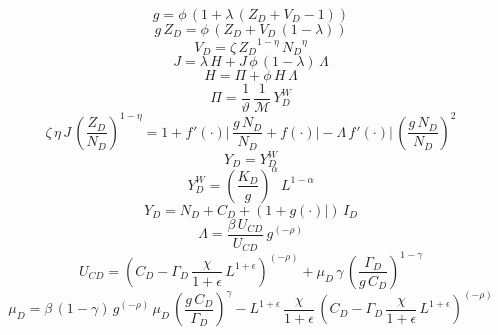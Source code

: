 \documentclass[10pt,a4paper]{article}
\begin{document}
\footnotesize
\begin{dmath}
{g}=\phi\, \left(1+\lambda\, \left({Z_D}+{V_D}-1\right)\right)
\end{dmath}
\begin{dmath}
{g}\, {Z_D}=\phi\, \left({Z_D}+{V_D}\, \left(1-\lambda\right)\right)
\end{dmath}
\begin{dmath}
{V_D}={\zeta}\, {Z_D}^{1-\eta}\, {N_D}^{\eta}
\end{dmath}
\begin{dmath}
{J}=\lambda\, {H}+{J}\, \phi\, \left(1-\lambda\right)\, {\Lambda}
\end{dmath}
\begin{dmath}
{H}={\Pi}+\phi\, {H}\, {\Lambda}
\end{dmath}
\begin{dmath}
{\Pi}=\frac{1}{\vartheta}\, \frac{1}{\mathcal{M}}\, {Y^W_D}
\end{dmath}
\begin{dmath}
{\zeta}\, \eta\, {J}\, \left(\frac{{Z_D}}{{N_D}}\right)^{1-\eta}=1+{\left.       f^‎{\prime}\left( \cdot \right)   \right|}\, \frac{{g}\, {N_D}}{{N_D}}+{\left.       f\left( \cdot \right)            \right|}-{\Lambda}\, {\left.       f^‎{\prime}\left( \cdot \right)   \right|}\, \left(\frac{{g}\, {N_D}}{{N_D}}\right)^{2}
\end{dmath}
\begin{dmath}
{Y_D}={Y^W_D}
\end{dmath}
\begin{dmath}
{Y^W_D}=\left(\frac{{K_D}}{{g}}\right)^{\alpha}\, {L}^{1-\alpha}
\end{dmath}
\begin{dmath}
{Y_D}={N_D}+{C_D}+\left(1+{\left.       g\left( \cdot \right)            \right|}\right)\, {I_D}
\end{dmath}
\begin{dmath}
{\Lambda}=\frac{\beta\, {U_{CD}}}{{U_{CD}}}\, {g}^{\left(-\rho\right)}
\end{dmath}
\begin{dmath}
{U_{CD}}=\left({C_D}-{\Gamma_D}\, \frac{\chi}{1+\epsilon}\, {L}^{1+\epsilon}\right)^{\left(-\rho\right)}+{{\mu}_{D}}\, \gamma\, \left(\frac{{\Gamma_D}}{{g}\, {C_D}}\right)^{1-\gamma}
\end{dmath}
\begin{dmath}
{{\mu}_{D}}=\beta\, \left(1-\gamma\right)\, {g}^{\left(-\rho\right)}\, {{\mu}_{D}}\, \left(\frac{{g}\, {C_D}}{{\Gamma_D}}\right)^{\gamma}-{L}^{1+\epsilon}\, \frac{\chi}{1+\epsilon}\, \left({C_D}-{\Gamma_D}\, \frac{\chi}{1+\epsilon}\, {L}^{1+\epsilon}\right)^{\left(-\rho\right)}
\end{dmath}
\end{document}
